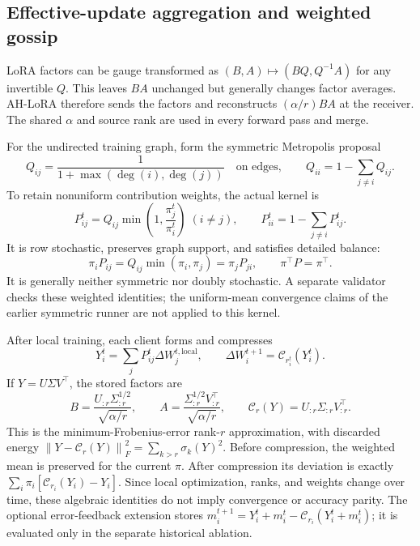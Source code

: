 \documentclass[11pt]{article}
\newcommand{\dW}{\Delta W}
\newcommand{\norm}[1]{\left\lVert#1\right\rVert}
\begin{document}
\subsection{Effective-update aggregation and weighted gossip}
LoRA factors can be gauge transformed as $(B,A)\mapsto(BQ,Q^{-1}A)$ for any invertible $Q$. This leaves $BA$ unchanged but generally changes factor averages. AH-LoRA therefore sends the factors and reconstructs $(\alpha/r)BA$ at the receiver. The shared $\alpha$ and source rank are used in every forward pass and merge.

For the undirected training graph, form the symmetric Metropolis proposal
\begin{equation}
 Q_{ij}=\frac1{1+\max(\deg(i),\deg(j))}\quad\text{on edges},\qquad
 Q_{ii}=1-\sum_{j\ne i}Q_{ij}.
\end{equation}
To retain nonuniform contribution weights, the actual kernel is
\begin{equation}
 P_{ij}^t=Q_{ij}\min\left(1,\frac{\pi_j^t}{\pi_i^t}\right)\;(i\ne j),
 \qquad P_{ii}^t=1-\sum_{j\ne i}P_{ij}^t.
 \label{eq:weighted-mh}
\end{equation}
It is row stochastic, preserves graph support, and satisfies detailed balance:
\begin{equation}
 \pi_iP_{ij}=Q_{ij}\min(\pi_i,\pi_j)=\pi_jP_{ji},\qquad \pi^\top P=\pi^\top.
\end{equation}
It is generally neither symmetric nor doubly stochastic. A separate validator checks these weighted identities; the uniform-mean convergence claims of the earlier symmetric runner are not applied to this kernel.

After local training, each client forms and compresses
\begin{equation}
 Y_i^t=\sum_jP_{ij}^t\dW_j^{t,\mathrm{local}},\qquad
 \dW_i^{t+1}=\mathcal C_{r_i^t}(Y_i^t).
 \label{eq:local-merge}
\end{equation}
If $Y=U\Sigma V^\top$, the stored factors are
\begin{equation}
 B=\frac{U_{:r}\Sigma_{:r}^{1/2}}{\sqrt{\alpha/r}},\qquad
 A=\frac{\Sigma_{:r}^{1/2}V_{:r}^\top}{\sqrt{\alpha/r}},\qquad
 \mathcal C_r(Y)=U_{:r}\Sigma_{:r}V_{:r}^\top.
\end{equation}
This is the minimum-Frobenius-error rank-$r$ approximation, with discarded energy $\norm{Y-\mathcal C_r(Y)}_F^2=\sum_{k>r}\sigma_k(Y)^2$. Before compression, the weighted mean is preserved for the current $\pi$. After compression its deviation is exactly $\sum_i\pi_i[\mathcal C_{r_i}(Y_i)-Y_i]$. Since local optimization, ranks, and weights change over time, these algebraic identities do not imply convergence or accuracy parity. The optional error-feedback extension stores $m_i^{t+1}=Y_i^t+m_i^t-\mathcal C_{r_i}(Y_i^t+m_i^t)$; it is evaluated only in the separate historical ablation.
\end{document}
